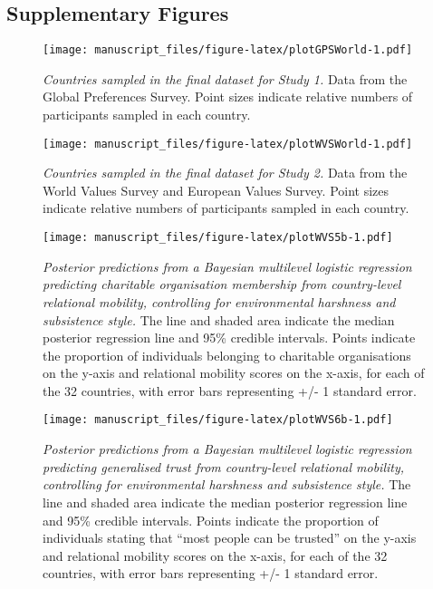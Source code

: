 \documentclass[
  man,floatsintext]{apa6}
\begin{document}
\newpage

\hypertarget{supplementary-figures}{%
\subsection{Supplementary Figures}\label{supplementary-figures}}



\begin{figure}
\centering
\texttt{[image: manuscript\_files/figure-latex/plotGPSWorld-1.pdf]}
\caption{\label{fig:plotGPSWorld}\emph{Countries sampled in the final dataset for Study 1.} Data from the Global Preferences Survey. Point sizes indicate relative numbers of participants sampled in each country.}
\end{figure}

\newpage



\begin{figure}
\centering
\texttt{[image: manuscript\_files/figure-latex/plotWVSWorld-1.pdf]}
\caption{\label{fig:plotWVSWorld}\emph{Countries sampled in the final dataset for Study 2.} Data from the World Values Survey and European Values Survey. Point sizes indicate relative numbers of participants sampled in each country.}
\end{figure}

\newpage



\begin{figure}
\centering
\texttt{[image: manuscript\_files/figure-latex/plotWVS5b-1.pdf]}
\caption{\label{fig:plotWVS5b}\emph{Posterior predictions from a Bayesian multilevel logistic regression predicting charitable organisation membership from country-level relational mobility, controlling for environmental harshness and subsistence style.} The line and shaded area indicate the median posterior regression line and 95\% credible intervals. Points indicate the proportion of individuals belonging to charitable organisations on the y-axis and relational mobility scores on the x-axis, for each of the 32 countries, with error bars representing +/- 1 standard error.}
\end{figure}

\newpage



\begin{figure}
\centering
\texttt{[image: manuscript\_files/figure-latex/plotWVS6b-1.pdf]}
\caption{\label{fig:plotWVS6b}\emph{Posterior predictions from a Bayesian multilevel logistic regression predicting generalised trust from country-level relational mobility, controlling for environmental harshness and subsistence style.} The line and shaded area indicate the median posterior regression line and 95\% credible intervals. Points indicate the proportion of individuals stating that ``most people can be trusted'' on the y-axis and relational mobility scores on the x-axis, for each of the 32 countries, with error bars representing +/- 1 standard error.}
\end{figure}
\end{document}
